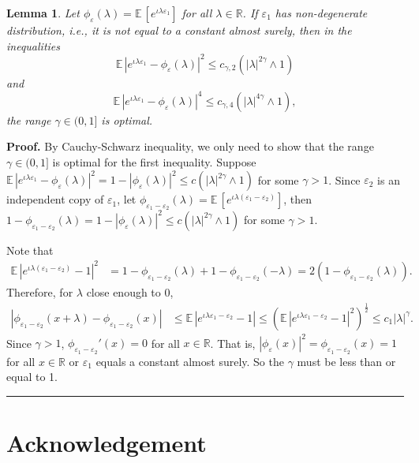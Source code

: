 \documentclass[11pt]{article}
\newtheorem{lemma}{Lemma}[section]
\newenvironment{proof}[1][Proof]{\textbf{#1.} }{\
\rule{0.5em}{0.5em}}
\def\R{{\mathbb R}}
\def\E{{{\mathbb E}\,}}
\begin{document}
\begin{lemma} \label{optimal}
Let $\phi_{\varepsilon}(\lambda)=\E[e^{\iota \lambda \varepsilon_1}]$ for all $\lambda\in\R$. If $\varepsilon_1$ has non-degenerate distribution, i.e., it is not equal to a constant almost surely, then in the inequalities
$$\E|e^{\iota\lambda\varepsilon_1}-\phi_{\varepsilon}(\lambda)|^2\leq c_{\gamma,2}(|\lambda|^{2\gamma}\wedge 1)$$ 
and 
$$\E|e^{\iota\lambda\varepsilon_1}-\phi_{\varepsilon}(\lambda)|^4\leq c_{\gamma,4}(|\lambda|^{4\gamma}\wedge 1),$$  
the range $\gamma\in(0,1]$ is optimal. 
\end{lemma}
\begin{proof}
By Cauchy-Schwarz inequality, we only need to show that the range $\gamma\in(0,1]$ is optimal for the first inequality. Suppose $\E|e^{\iota \lambda \varepsilon_1}-\phi_{\varepsilon}(\lambda)|^2=1-|\phi_{\varepsilon}(\lambda)|^2\leq c(|\lambda|^{2\gamma}\wedge 1)$ for some $\gamma>1$. Since $\varepsilon_2$ is an independent copy of $\varepsilon_1$,  let $\phi_{\varepsilon_1-\varepsilon_2}(\lambda)=\E[e^{\iota \lambda (\varepsilon_1-\varepsilon_2)}]$,  then $1-\phi_{\varepsilon_1-\varepsilon_2}(\lambda)=1-|\phi_{\varepsilon}(\lambda)|^2\leq c(|\lambda|^{2\gamma}\wedge 1)$ for some $\gamma>1$. 

Note that
\begin{align*}
\E|e^{\iota \lambda (\varepsilon_1-\varepsilon_2)} -1|^2
&=1-\phi_{\varepsilon_1-\varepsilon_2}(\lambda)+1-\phi_{\varepsilon_1-\varepsilon_2}(-\lambda)=2(1-\phi_{\varepsilon_1-\varepsilon_2}(\lambda)).
\end{align*}
Therefore, for $\lambda$ close enough to 0,
\begin{align*}
|\phi_{\varepsilon_1-\varepsilon_2}(x+\lambda)-\phi_{\varepsilon_1-\varepsilon_2}(x)|
&\leq \E|e^{\iota \lambda \varepsilon_1-\varepsilon_2} -1|\leq \left( \E|e^{\iota \lambda \varepsilon_1-\varepsilon_2} -1|^2\right)^{\frac{1}{2}}\leq c_1 |\lambda|^{\gamma}.
\end{align*}
Since $\gamma>1$, $\phi_{\varepsilon_1-\varepsilon_2}'(x)=0$ for all $x\in\R$. That is, $|\phi_{\varepsilon}(x)|^2=\phi_{\varepsilon_1-\varepsilon_2}(x)=1$ for all $x\in\R$ or $\varepsilon_1$ equals a constant almost surely. 
So the $\gamma$ must be less than or equal to 1. 
\end{proof}

\section*{Acknowledgement}
\end{document}
